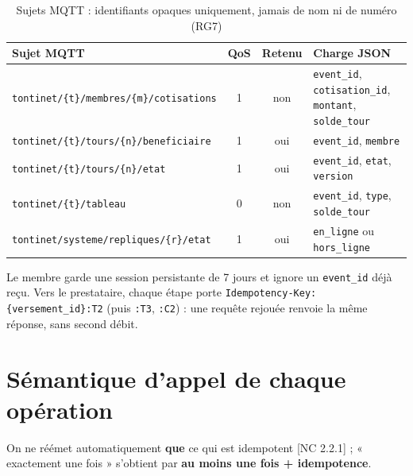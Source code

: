 \documentclass[12pt,a4paper]{article}
\begin{document}
\begin{table}[H]
\centering
\small
{}
\begin{tabularx}{\linewidth}{@{}>{\raggedright\arraybackslash}p{6.9cm} c c >{\raggedright\arraybackslash}X@{}}
\toprule
\textbf{Sujet MQTT} & \textbf{QoS} & \textbf{Retenu} & \textbf{Charge JSON} \\
\midrule
\texttt{tontinet/\{t\}/membres/\allowbreak\{m\}/cotisations} & 1 & non & \texttt{event\_id}, \texttt{cotisation\_id}, \texttt{montant}, \texttt{solde\_tour} \\
\texttt{tontinet/\{t\}/tours/\allowbreak\{n\}/beneficiaire} & 1 & oui & \texttt{event\_id}, \texttt{membre} \\
\texttt{tontinet/\{t\}/tours/\{n\}/etat} & 1 & oui & \texttt{event\_id}, \texttt{etat}, \texttt{version} \\
\texttt{tontinet/\{t\}/tableau} & 0 & non & \texttt{event\_id}, \texttt{type}, \texttt{solde\_tour} \\
\texttt{tontinet/systeme/\allowbreak repliques/\{r\}/etat} & 1 & oui & \texttt{en\_ligne} ou \texttt{hors\_ligne} \\
\bottomrule
\end{tabularx}
\caption{Sujets MQTT : identifiants opaques uniquement, jamais de nom ni de numéro (RG7)}
\label{tab:mqtt}
\end{table}

Le membre garde une session persistante de 7 jours et ignore un \texttt{event\_id} déjà reçu.
Vers le prestataire, chaque étape porte \texttt{Idempotency-Key: \{versement\_id\}:T2} (puis
\texttt{:T3}, \texttt{:C2}) : une requête rejouée renvoie la même réponse, sans second débit.

\section{Sémantique d'appel de chaque opération}
\label{sec:semantique}

On ne réémet automatiquement \textbf{que} ce qui est idempotent [NC 2.2.1] ; « exactement une
fois » s'obtient par \textbf{au moins une fois + idempotence}.
\end{document}
